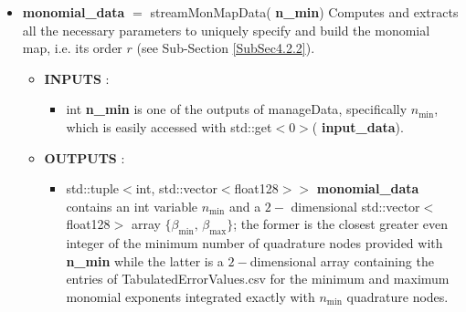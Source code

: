 \documentclass[a4paper, twosided]{book}
\begin{document}
\begin{itemize}
    \item \color{poliDarkBlue} \textbf{monomial\_data} \color{black} $=$ \colorbox{poliGrayBlue}{streamMonMapData}(\color{poliDarkBlue} \textbf{n\_min}\color{black})
    \newline Computes and extracts all the necessary parameters to uniquely specify and build the monomial map, i.e. its order $r$ (see Sub-Section \ref{SubSec4.2.2}).
    \begin{itemize}
        \item \color{poliDarkBlue} \textbf{INPUTS} \color{black}:
        \begin{itemize}
            \item \colorbox{poliGrayBlue}{int} \color{poliDarkBlue} \textbf{n\_min} \color{black} is one of the outputs of \colorbox{poliGrayBlue}{manageData}, specifically $n_{\text{min}}$, which is easily accessed with \colorbox{poliGrayBlue}{std::get$<$0$>$}(\color{poliDarkBlue} \textbf{input\_data}\color{black}).
        \end{itemize}
        \item \color{poliDarkBlue} \textbf{OUTPUTS} \color{black}:
        \begin{itemize}
            \item \colorbox{poliGrayBlue}{std::tuple$<$int, std::vector$<$float128$>>$} \color{poliDarkBlue} \textbf{monomial\_data} \color{black} contains an \colorbox{poliGrayBlue}{int} variable $n_{\text{min}}$ and a $2-$ dimensional \colorbox{poliGrayBlue}{std::vector$<$float128$>$} array $\{\beta_{\text{min}}, \,\beta_{\text{max}}\}$; the former is the closest greater even integer of the minimum number of quadrature nodes provided with \color{poliDarkBlue} \textbf{n\_min} \color{black} while the latter is a $2-$dimensional array containing the entries of \colorbox{poliGrayBlue}{TabulatedErrorValues.csv}
            for the minimum and maximum monomial exponents integrated exactly with $n_{\text{min}}$ quadrature nodes.
        \end{itemize}
    \end{itemize}
    

\end{itemize}
\end{document}
